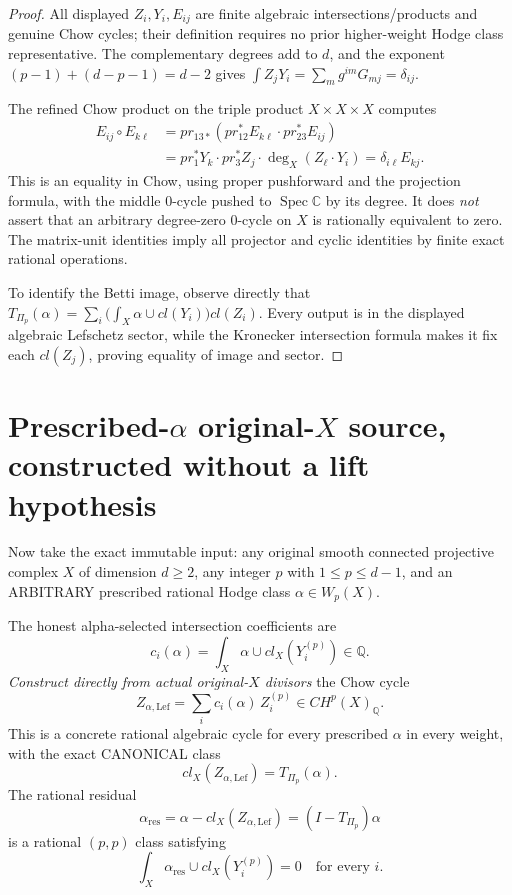 \documentclass[11pt]{article}
\begin{document}
\begin{proof}
All displayed $Z_i,Y_i,E_{ij}$ are finite algebraic
intersections/products and genuine Chow cycles; their definition
requires no prior higher-weight Hodge class representative.
The complementary degrees add to $d$, and the exponent
$(p-1)+(d-p-1)=d-2$ gives
$\int Z_jY_i=\sum_m g^{im}G_{mj}=\delta_{ij}$.

The refined Chow product on the triple product
$X\times X\times X$ computes
\[
\begin{aligned}
E_{ij}\circ E_{k\ell}
&=pr_{13*}(pr_{12}^*E_{k\ell}\cdot pr_{23}^*E_{ij})\\
&=pr_1^*Y_k\cdot
  pr_3^*Z_j\cdot
  \deg_X(Z_\ell\cdot Y_i)
=\delta_{i\ell}E_{kj}.
\end{aligned}
\]
This is an equality in Chow, using proper pushforward and
the projection formula, with the middle 0-cycle pushed to
$\operatorname{Spec}\mathbb C$ by its degree.
It does \emph{not} assert that an arbitrary degree-zero 0-cycle
on $X$ is rationally equivalent to zero.
The matrix-unit identities imply all projector and
cyclic identities by finite exact rational operations.

To identify the Betti image, observe directly that
$T_{\Pi_p}(\alpha)=
\sum_i\bigl(\int_X\alpha\cup cl(Y_i)\bigr)cl(Z_i)$.
Every output is in the displayed algebraic Lefschetz sector,
while the Kronecker intersection formula makes it fix each
$cl(Z_j)$, proving equality of image and sector.
\end{proof}

\section{Prescribed-$\alpha$ original-$X$ source, constructed without a lift hypothesis}

Now take the exact immutable input:
any original smooth connected projective complex $X$ of dimension
$d\ge2$, any integer $p$ with $1\le p\le d-1$, and an
ARBITRARY prescribed rational Hodge class
$\alpha\in W_p(X)$.

The honest alpha-selected intersection coefficients are
\[
c_i(\alpha)=\int_X\alpha\cup cl_X(Y_i^{(p)})\in\mathbb Q.
\]
\emph{Construct directly from actual original-$X$ divisors}
the Chow cycle
\[
\boxed{
Z_{\alpha,\mathrm{Lef}}
=\sum_i c_i(\alpha)\,Z_i^{(p)}
\in CH^p(X)_{\mathbb Q}.
}
\]
This is a concrete rational algebraic cycle for every prescribed
$\alpha$ in every weight, with the exact CANONICAL class
\[
\boxed{
cl_X(Z_{\alpha,\mathrm{Lef}})
=T_{\Pi_p}(\alpha).
}
\]
The rational residual
\[
\alpha_{\mathrm{res}}=\alpha-cl_X(Z_{\alpha,\mathrm{Lef}})
=(I-T_{\Pi_p})\alpha
\]
is a rational $(p,p)$ class satisfying
\[
\int_X\alpha_{\mathrm{res}}\cup cl_X(Y_i^{(p)})=0
\quad\text{for every }i.
\]
\end{document}
